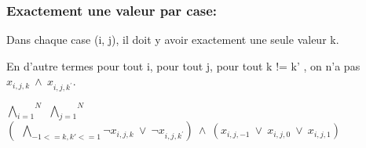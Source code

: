 \documentclass[utf8]{article}
\begin{document}
\subsubsection{Exactement une valeur par case: }
Dans chaque case (i, j), il doit y avoir exactement une seule valeur k.

En d’autre termes pour tout i,
pour tout j, pour tout k != k'
, on n’a pas $x_{i,j,k} ~ \land ~ x_{i,j,{k^\prime}}$.
\newline

$\overset{N}{\underset{i=1}{\bigwedge}}
~~\overset{N}{\underset{j=1}{\bigwedge}}$
$(~~\underset{-1<={k,k'}<=1}{\bigwedge}
\neg x_{i,j,k} ~ \lor ~ \neg x_{i,j,{k^\prime}})
 ~ \land ~ (x_{i,j,-1} ~ \lor ~ x_{i,j,0} ~ \lor ~ x_{i,j,1})$
 
\begin{comment}
 
\subsubsection{\colorbox{orange}{Voisin}}
On commence par définir ce qu’est un voisin : 
il s’agit d’une autre case dont les coordonnées ne sont pas éloignées de plus de 1.

$V (i, j) = {(i', j') \in [1, N]^2| max(|i - i'|, |j - j'| = 1)}$
 
Considérant une case (i,j) 
alors une voisine se trouve en (i,j-1) 
et l'autre en (i,j+1) 

Considérant une case x$_{i,j,k}$, alors une voisine se trouve en x$_{i,j-1,k^\prime}$ et l'autre en x$_{i,j+1,k^{\prime\prime}}$

$(x_{i,j-1,k} \lor ~~ x_{i,j-1,k^\prime} )
\land ~~
x_i,_j,_k 
\land ~~
(x_{i,j+1,k^\prime} \lor ~~ x_{i,j+1,k})$

\paragraph{sur même ligne}
Considérant une case (i,j) 
alors une voisine se trouve en (i,j-1) 
et l'autre en (i,j+1) 



$x_{i,j,1} \land ~~ 
((x_{i,j-1,1} \land x_{i,j+1,0}) \lor 
~~ (x_{i,j-1,0} \land x_{i,j+1,1}))$

\paragraph{sur même colonne}
Considérant une case (i,j) 
alors une voisine se trouve en (i-1,j) 
et l'autre en (i+1,j) 


$(x_{i-1,j,1} \lor ~~ x_{i-1,j,0} )
\land ~~
x_{i,j,1}
\land ~~
(x_{i+1,j,0} \lor ~~ x_{i+1,j,1})$

\end{comment}
\end{document}
